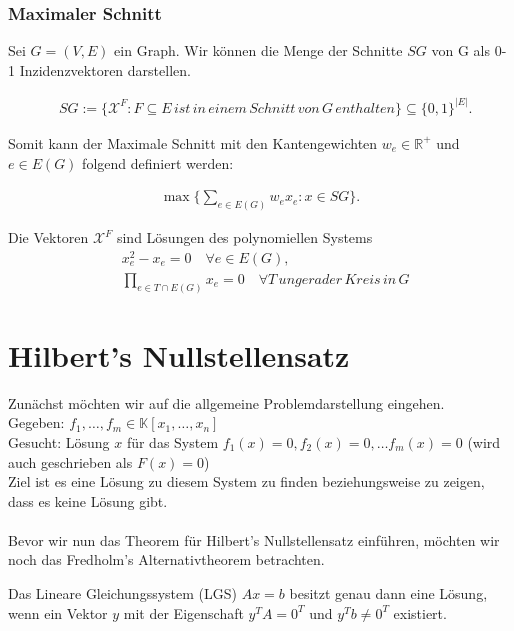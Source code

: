 \subsubsection*{Maximaler Schnitt}

\begin{lemma}
Sei $G = (V, E)$ ein Graph. Wir können die Menge der Schnitte $SG$ von G als 0-1 Inzidenzvektoren darstellen.

\begin{align*}
&SG := \{ \mathcal{X}^F:F \subseteq E \, ist \, in \, einem \, Schnitt \, von \, G \, enthalten \} \subseteq  \{0,1\}^{\vert E \vert}.
\end{align*} 

\noindent Somit kann der Maximale Schnitt mit den Kantengewichten $w_e \in \mathbb{R}^+$ und $e \in E(G)$ folgend definiert werden:

\begin{align*}
\max\{\sum_{e \in E(G)} w_e x_e : x \in SG\}. 
\end{align*} 

\noindent Die Vektoren $\mathcal{X}^F$ sind Lösungen des polynomiellen Systems 
\begin{align*}
&x_e^2 - x_e = 0 \quad \forall e \in E(G),\\
&\prod_{e\in T\cap E(G)}x_e = 0 \quad \forall T \, ungerader \, Kreis \, in \, G
\end{align*} \cite{Ausgangsartikel}
\end{lemma}


\section{Hilbert's Nullstellensatz } \label{HilbertNull}

Zunächst möchten wir auf die allgemeine Problemdarstellung eingehen. \\
Gegeben: $f_1,\ldots,f_m \in \mathbb{K}[x_1,\ldots,x_n]$ \\
Gesucht: Lösung $x$ für das System $f_1(x) = 0, f_2(x) = 0, \ldots f_m(x) = 0$ (wird auch geschrieben als $F(x) = 0$) \\
Ziel ist es eine Lösung zu diesem System zu finden beziehungsweise zu zeigen, dass es keine Lösung gibt. \\
\\
Bevor wir nun das Theorem für Hilbert's Nullstellensatz einführen, möchten wir noch das Fredholm's Alternativtheorem betrachten.

\begin{theorem} \label{Fredi}
Das Lineare Gleichungssystem (LGS) $Ax=b$ besitzt genau dann eine Lösung, wenn ein Vektor $y$ mit der Eigenschaft $y^TA=0^T$ und $y^Tb\neq 0^T$ existiert. 
\end{theorem}

